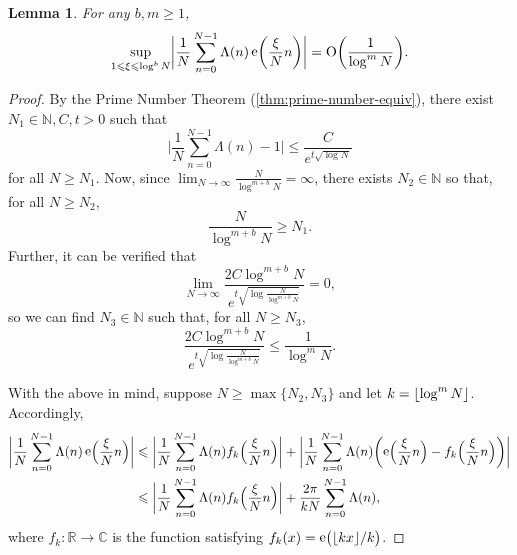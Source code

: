 \documentclass[letterpaper, 12pt]{article}
\theoremstyle{plain}
\newtheorem{Lemma}[Theorem]{Lemma}
\theoremstyle{definition}
\theoremstyle{plain}
\theoremstyle{plain}
\numberwithin{equation}{section}
\newcommand{\Oh}{{\rm O}}
\newcommand{\N}{\mathbb{N}}
\newcommand{\R}{\mathbb{R}}
\newcommand{\C}{\mathbb{C}}
\renewcommand{\leq}{\leqslant}
\renewcommand{\geq}{\geqslant}
\newcommand{\1}{\textbf{1}}
\DeclarePairedDelimiter\floor{\lfloor}{\rfloor}
\DeclareMathOperator{\e}{e}
\begin{document}
\begin{Lemma}\label{lem:small-xi-bound}
    For any $b, m \geq 1$,
    \[
        \sup_{1 \leq \xi \leq \log^b N}  \biggl\lvert \frac{1}{N} \sum_{n = 0}^{N - 1} \Lambda(n) \e\biggl(\frac{\xi}{N} n \biggr)\biggr\rvert 
        = \Oh\biggl(\frac{1}{\log^m N} \biggr).
    \]
\end{Lemma}
\begin{proof}
    By the Prime Number Theorem (\cref{thm:prime-number-equiv}), there exist $N_1 \in \N,  C, t > 0$ such that 
    \begin{equation*}
        \biggl\lvert \frac{1}{N} \sum_{n = 0}^{N - 1} \Lambda(n) - 1 \biggr\rvert 
        \leq \frac{C}{e^{t\sqrt{\log N}}} 
    \end{equation*}
    for all \(N \geq N_1\).
    Now, since $\displaystyle \lim_{N \to \infty} \frac{N}{\log^{m+b} N} = \infty$, there exists $N_2 \in \N$ so that, for all \(N \geq N_2\),
    \[
        \frac{N}{\log^{m + b} N} \geq N_1.
    \]
    Further, it can be verified that 
    \begin{equation*}
        \lim_{N \to \infty} \frac{2C\log^{m + b} N}{e^{t \sqrt{\log \frac{N}{\log^{m + b} N}}}} = 0,
    \end{equation*}
    so we can find $N_3 \in \N$ such that, for all \(N \geq N_3\),
    \begin{equation*}
        \frac{2C\log^{m + b} N}{e^{t \sqrt{\log \frac{N}{\log^{m + b} N}}}}
        \leq \frac{1}{\log^m N}.
    \end{equation*}

    With the above in mind, suppose $N \geq \max\{N_2, N_3\}$ and let $k = \floor{\log^m N}$. Accordingly,
    \begin{align}
        \biggl\lvert \frac{1}{N} \sum_{n = 0}^{N - 1} \Lambda(n) \e\Bigl(\frac{\xi}{N} n \Bigr) \biggr\rvert
        &\leq \biggl\lvert \frac{1}{N} \sum_{n = 0}^{N - 1} \Lambda(n) f_k\Bigl(\frac{\xi}{N} n \Bigr) \biggr\rvert 
        + \biggl\lvert \frac{1}{N} \sum_{n = 0}^{N - 1} \Lambda(n) \biggl(\e\Bigl(\frac{\xi}{N} n \Bigr) - f_k\Bigl(\frac{\xi}{N} n \Bigr)\biggr)\biggr\rvert \nonumber\\
        &\leq \biggl\lvert \frac{1}{N} \sum_{n = 0}^{N - 1} \Lambda(n) f_k\Bigl(\frac{\xi}{N} n \Bigr) \biggr\rvert + \frac{2\pi}{kN} \sum_{n = 0}^{N - 1} \Lambda(n),\label{eqn:from-N-big}
    \end{align}
    where $f_k \colon \R \to \C$ is the function satisfying $f_k(x) = \e\bigl(\floor{kx}/k \bigr)$.
    

\end{proof}
\end{document}
